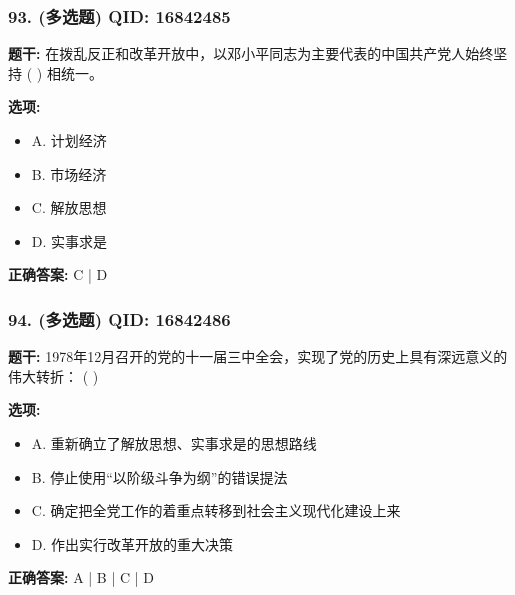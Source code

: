 \documentclass[12pt,UTF8]{ctexart}
\begin{document}
\subsubsection*{93. (多选题) \small QID: 16842485}

\textbf{题干:}
在拨乱反正和改革开放中，以邓小平同志为主要代表的中国共产党人始终坚持 ( ) 相统一。

\textbf{选项:}
\begin{itemize}[leftmargin=*]

  \item A. 计划经济

  \item B. 市场经济

  \item C. 解放思想

  \item D. 实事求是

\end{itemize}

\textbf{正确答案:}
C | D

\vspace{0.3em}\hrulefill\vspace{0.7em}

\subsubsection*{94. (多选题) \small QID: 16842486}

\textbf{题干:}
1978年12月召开的党的十一届三中全会，实现了党的历史上具有深远意义的伟大转折： ( )

\textbf{选项:}
\begin{itemize}[leftmargin=*]

  \item A. 重新确立了解放思想、实事求是的思想路线

  \item B. 停止使用“以阶级斗争为纲”的错误提法

  \item C. 确定把全党工作的着重点转移到社会主义现代化建设上来

  \item D. 作出实行改革开放的重大决策

\end{itemize}

\textbf{正确答案:}
A | B | C | D

\vspace{0.3em}\hrulefill\vspace{0.7em}
\end{document}
